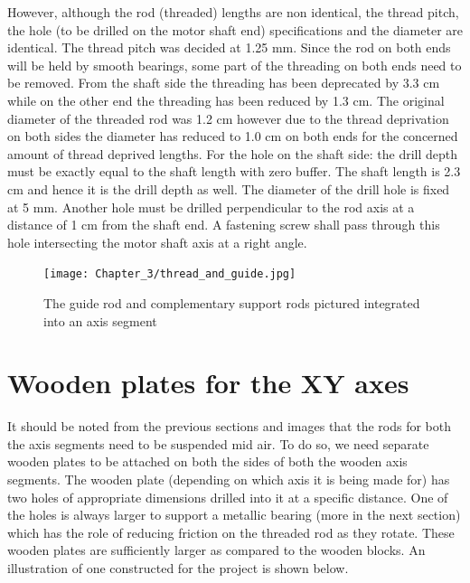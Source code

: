 However, although the rod (threaded) lengths are non identical, the thread pitch, the hole (to be drilled on the motor shaft end) specifications and the diameter are identical. The thread pitch was decided at 1.25 mm. Since the rod on both ends will be held by smooth bearings, some part of the threading on both ends need to be removed. From the shaft side the threading has been deprecated by 3.3 cm while on the other end the threading has been reduced by 1.3 cm. The original diameter of the threaded rod was 1.2 cm however due to the thread deprivation on both sides the diameter has reduced to 1.0 cm on both ends for the concerned amount of thread deprived lengths. For the hole on the shaft side: the drill depth must be exactly equal to the shaft length with zero buffer. The shaft length is 2.3 cm and hence it is the drill depth as well. The diameter of the drill hole is fixed at 5 mm. Another hole must be drilled perpendicular to the rod axis at a distance of 1 cm from the shaft end. A fastening screw shall pass through this hole intersecting the motor shaft axis at a right angle.

\begin{figure}[h]
 \centering
 \texttt{[image: Chapter\_3/thread\_and\_guide.jpg]}
 \caption{The guide rod and complementary support rods pictured integrated into an axis segment }
 \label{fig:xy_rods}
\end{figure}


\section{Wooden plates for the XY axes}

It should be noted from the previous sections and images that the rods for both the axis segments need to be suspended mid air. To do so, we need separate wooden plates to be attached on both the sides of both the wooden axis segments. The wooden plate (depending on which axis it is being made for) has two holes of appropriate dimensions drilled into it at a specific distance. One of the holes is always larger to support a metallic bearing (more in the next section) which has the role of reducing friction on the threaded rod as they rotate. These wooden plates are sufficiently larger as compared to the wooden blocks. An illustration of one constructed for the project is shown below.

